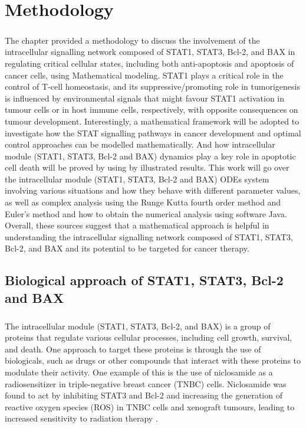 \chapter{Methodology}
\label{chap:03}
\paragraph{}

The chapter provided a methodology  to discuss the involvement of the intracellular signalling network composed of STAT1, STAT3, Bcl-2, and BAX in regulating critical cellular states, including both anti-apoptosis and apoptosis of cancer cells, using Mathematical modeling. 
STAT1 plays a critical role in the control of T-cell homeostasis, and its suppressive/promoting role in tumorigenesis is influenced by environmental signals that might favour STAT1 activation in tumour cells or in host immune cells, respectively, with opposite consequences on tumour development. Interestingly, a mathematical framework will be adopted  to investigate how the STAT signalling pathways in cancer development and optimal control approaches can be modelled mathematically. And how intracellular module (STAT1, STAT3, Bcl-2 and BAX) dynamics play a key role in apoptotic cell death will be proved by using by illustrated results. This work will go over the intracellular module (STAT1, STAT3, Bcl-2 and BAX) ODEs system involving various situations and how they behave with different parameter values, as well as complex analysis using the Runge Kutta fourth order method and Euler's method and how to obtain the numerical analysis using software Java. Overall, these sources suggest that a mathematical approach is helpful in understanding the intracellular signalling network composed of STAT1, STAT3, Bcl-2, and BAX and its potential to be targeted for cancer therapy.


\newpage

\section{Biological approach of STAT1, STAT3, Bcl-2 and BAX}
\paragraph{}

The intracellular module (STAT1, STAT3, Bcl-2, and BAX) is a group of proteins that regulate various cellular processes, including cell growth, survival, and death. One approach to target these proteins is through the use of biologicals, such as drugs or other compounds that interact with these proteins to modulate their activity. One example of this is the use of niclosamide as a radiosensitizer in triple-negative breast cancer (TNBC) cells. Niclosamide was found to act by inhibiting STAT3 and Bcl-2 and increasing the generation of reactive oxygen species (ROS) in TNBC cells and xenograft tumours, leading to increased sensitivity to radiation therapy \cite{lu2018activation}. 


